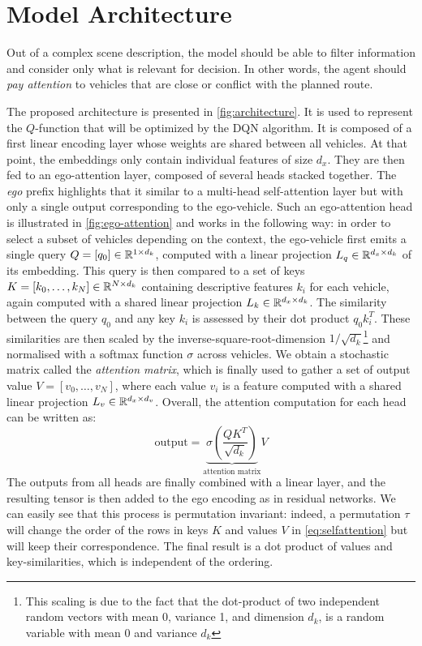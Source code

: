 \documentclass{article}
\begin{document}
\section{Model Architecture}
\label{sec:architecture}

Out of a complex scene description, the model should be able to filter information and consider only what is relevant for decision. In other words, the agent should \emph{pay attention} to vehicles that are close or conflict with the planned route. 

The proposed architecture is presented in \autoref{fig:architecture}. It is used to represent the $Q$-function that will be optimized by the DQN algorithm. It is composed of a first linear encoding layer whose weights are shared between all vehicles. At that point, the embeddings only contain individual features of size $d_x$. They are then fed to an ego-attention layer, composed of several heads stacked together. The \emph{ego} prefix highlights that it similar to a multi-head self-attention layer \citep{Vaswani2017} but with only a single output corresponding to the ego-vehicle. Such an ego-attention head is illustrated in \autoref{fig:ego-attention} and works in the following way: in order to select a subset of vehicles depending on the context, the ego-vehicle  first emits a single query $Q = [q_0]\in\mathbb{R}^{1 \times d_k}$, computed with a linear projection $L_q\in\mathbb{R}^{d_x \times d_k}$ of its embedding. This query is then compared to a set of keys $K = [k_0, \dots, k_N]\in\mathbb{R}^{N \times d_k}$ containing descriptive features $k_i$ for each vehicle, again computed with a shared linear projection $L_k\in\mathbb{R}^{d_x \times d_k}$. The similarity between the query $q_0$ and any key $k_i$ is assessed by their dot product $q_0 k_i^T$. These similarities are then scaled by the inverse-square-root-dimension $1/\sqrt{d_k}$\footnote{This scaling is due to the fact that the dot-product of two independent random vectors with mean 0,  variance 1, and dimension $d_k$, is a random variable with mean 0 and variance $d_k$} and normalised with a softmax function $\sigma$ across vehicles. We obtain a stochastic matrix called the \emph{attention matrix}, which is finally used to gather a set of output value $V = [v_0, \dots, v_N]$, where each value $v_i$ is a feature computed with a shared linear projection $L_v\in\mathbb{R}^{d_x \times d_v}$. Overall, the attention computation for each head can be written as:
\begin{equation}
\text{output}=\underbrace{\sigma\left(\frac{QK^T}{\sqrt{d_k}}\right)}_{\text{attention matrix}}V
\label{eq:selfattention}
\end{equation}
The outputs from all heads are finally combined with a linear layer, and the resulting tensor is then added to the ego encoding as in residual networks. We can easily see that this process is permutation invariant: indeed, a permutation $\tau$ will change the order of the rows in keys $K$ and values $V$ in \eqref{eq:selfattention} but will keep their correspondence. The final result is a dot product of values and key-similarities, which is independent of the ordering.
\end{document}
